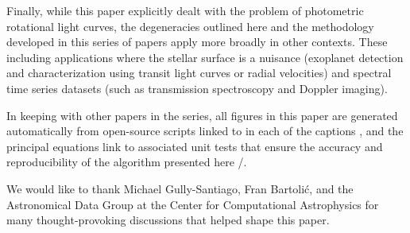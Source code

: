 \documentclass[modern,linenumbers]{aastex62}
\begin{document}
Finally, while this paper explicitly dealt with the problem of
photometric rotational light curves, the degeneracies outlined
here and the methodology developed in this series of papers
apply more broadly in other contexts.
These including applications where the stellar
surface is a nuisance (exoplanet detection and characterization using
transit light curves or radial velocities) and spectral time series
datasets (such as transmission spectroscopy and Doppler imaging).


\vspace{2em}

In keeping with other papers in the \starry series, all figures in this
paper are generated automatically from open-source scripts linked to in
each of the captions \codeicon, and the principal equations link to associated
unit tests that ensure the accuracy and reproducibility of the algorithm
presented here \testpassicon/\testfailicon.

%
%
%
%
%
%
%
%

\vspace{2em}

We would like to thank Michael Gully-Santiago, Fran Bartoli\'c, and the
Astronomical Data Group at the Center for Computational Astrophysics for
many thought-provoking discussions that helped shape this paper.



\appendix
\end{document}
